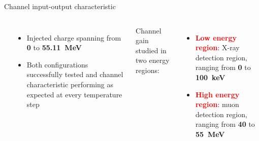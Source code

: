 \documentclass[aspectratio=169,xcolor=dvipsnamesz]{beamer} %
\newcommand{\greencheck}{{\color{ForestGreen}\checkmark}}
\begin{document}
\begin{frame}{Channel input-output characteristic}
\begin{columns}
\begin{center}
            \end{center}    
            \vskip-0.2cm
            \begin{itemize}
                \item Injected charge spanning from \textbf{0} to \textbf{\SI{55.11}{\mega\electronvolt}} \greencheck
                \item Both configurations successfully tested and channel characteristic performing as expected at every temperature step \greencheck
            \end{itemize}
            \vskip0.3cm
            Channel gain studied in two energy regions:
            \begin{itemize}
                \item \textbf{\textcolor{Red}{Low energy region}}: X-ray detection region, ranging from \textbf{0} to \textbf{\SI{100}{\kilo\electronvolt}}
                \item \textbf{\textcolor{Red}{High energy region}}: muon detection region, ranging from \textbf{40} to \textbf{\SI{55}{\mega\electronvolt}}
            \end{itemize}
            \vspace{0.4cm}
    \end{columns}
\end{frame}


\end{document}
